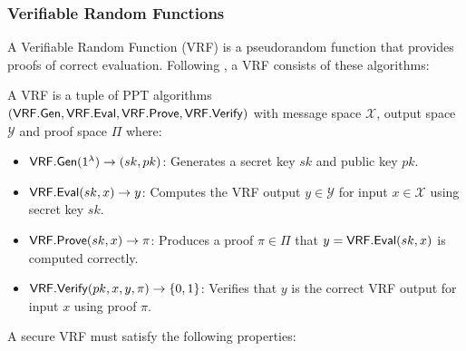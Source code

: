 \subsubsection{Verifiable Random Functions}
A Verifiable Random Function (VRF) \cite{micali_verifiable_1999, hutchison_verifiable_2005} is a pseudorandom function that provides proofs of correct evaluation. Following \cite{bitansky_verifiable_2020}, a VRF consists of these algorithms:

\begin{definition}
A VRF is a tuple of PPT algorithms \\
$(\mathsf{VRF.Gen}, \mathsf{VRF.Eval}, \mathsf{VRF.Prove}, \mathsf{VRF.Verify})$ with message space $\mathcal{X}$, output space $\mathcal{Y}$ and proof space $\Pi$ where:
\begin{itemize}
    \item $\mathsf{VRF.Gen}(1^\lambda) \to (sk, pk)$: Generates a secret key $sk$ and public key $pk$.
    \item $\mathsf{VRF.Eval}(sk,x) \to y$: Computes the VRF output $y \in \mathcal{Y}$ for input $x \in \mathcal{X}$ using secret key $sk$.
    \item $\mathsf{VRF.Prove}(sk,x) \to \pi$: Produces a proof $\pi \in \Pi$ that $y = \mathsf{VRF.Eval}(sk,x)$ is computed correctly.
    \item $\mathsf{VRF.Verify}(pk,x,y,\pi) \to \{0,1\}$: Verifies that $y$ is the correct VRF output for input $x$ using proof $\pi$.
\end{itemize}
\end{definition}

A secure VRF must satisfy the following properties:

